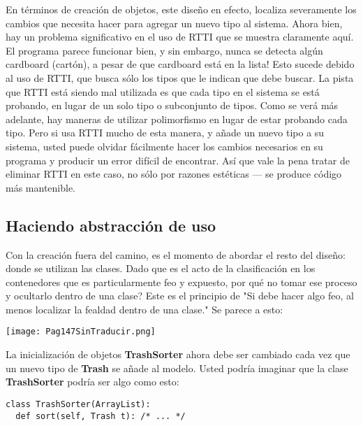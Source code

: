 En términos de creación de objetos, este diseño en efecto, localiza severamente los cambios que necesita hacer para agregar un nuevo tipo al sistema. Ahora bien, hay un problema significativo en el uso de RTTI que se muestra claramente aquí. El programa parece funcionar bien, y sin embargo, nunca se detecta algún cardboard (cartón), a pesar de que cardboard está en la lista! Esto sucede debido al uso de RTTI, que busca sólo los tipos que le indican que debe buscar. La pista que RTTI está siendo mal utilizada es que cada tipo en el sistema se está probando, en lugar de un solo tipo o subconjunto de tipos. Como se verá más adelante, hay maneras de utilizar polimorfismo en lugar de estar probando cada tipo. Pero si usa RTTI mucho de esta manera, y añade un nuevo tipo a su sistema, usted puede olvidar fácilmente  hacer los cambios necesarios en su programa y producir un error difícil de encontrar. Así que vale la pena tratar de eliminar RTTI en este caso, no sólo por razones estéticas — se produce código más mantenible.      \newline



\subsection*{Haciendo abstracción de uso}
\label{subsec:hadu}


Con la creación fuera del camino, es el momento de abordar el resto del diseño: donde se utilizan las clases. Dado que es el acto de la clasificación en los contenedores que es particularmente feo y expuesto, por qué no tomar ese proceso y ocultarlo dentro de una clase? Este es el principio de "Si debe hacer algo feo, al menos localizar la fealdad dentro de una clase." Se parece a esto:   \newline

\texttt{[image: Pag147SinTraducir.png]}

La inicialización de objetos \textbf{TrashSorter} ahora debe ser cambiado cada vez que un nuevo tipo de \textbf{Trash} se añade al modelo. Usted podría imaginar que la clase \textbf{TrashSorter} podría ser algo como esto:     \newline

\begin{lstlisting} 
class TrashSorter(ArrayList): 
  def sort(self, Trash t): /* ... */  
\end{lstlisting}

